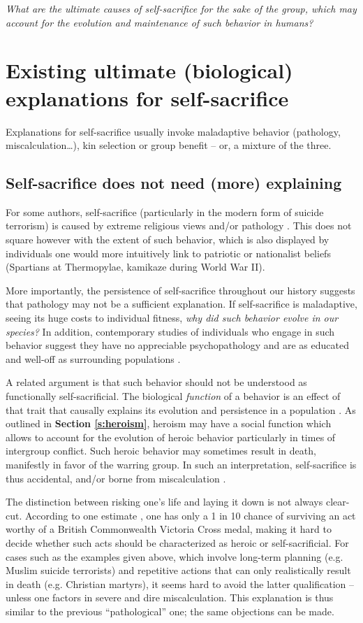 \documentclass[a4paper,12pt]{report}
\begin{document}
\emph{What are the ultimate causes of self-sacrifice for the sake of the group, 
which may account for the evolution and maintenance of such behavior in humans?}

\section{Existing ultimate (biological) explanations for self-sacrifice}
\label{s:xpla}
Explanations for self-sacrifice usually invoke maladaptive behavior
(pathology, miscalculation…), kin selection or group benefit – or, a mixture of the three.

\subsection{Self-sacrifice does not need (more) explaining}
\label{ss:error}
For some authors, self-sacrifice (particularly in the modern form of suicide terrorism)
is caused by extreme religious views and/or pathology \cite[p. 16]{pape_dying_2006}.
This does not square however with the extent of such behavior, which is also displayed
by individuals one would more intuitively link to patriotic or nationalist beliefs
(Spartians at Thermopylae, kamikaze during World War II).

More importantly, the persistence of self-sacrifice throughout our history suggests
that pathology may not be a sufficient explanation. If self-sacrifice is maladaptive,
seeing its huge costs to individual fitness, \emph{why did such behavior evolve in our species?}
In addition, contemporary studies of individuals who engage in such behavior suggest
they have no appreciable psychopathology and are as educated and well-off as 
surrounding populations \cite{atran_genesis_2003}.

A related argument is that such behavior should not be understood as
functionally self-sacrificial. The biological \emph{function} of a behavior is an effect
of that trait that causally explains its evolution and persistence in a population
\cite{nettle_evolution_2009}.
As outlined in \textbf{Section \ref{s:heroism}}, heroism may have a social function which
allows to account for the evolution of heroic behavior particularly in times of intergroup
conflict. Such heroic behavior may sometimes result in death, manifestly in favor of
the warring group. In such an interpretation, self-sacrifice is thus accidental, and/or
borne from miscalculation \cite{marie_self-sacrifice_2018}.

The distinction between risking one’s life and laying it down is not always clear-cut.
According to one estimate \cite[p. 272]{gambetta_making_2006}, one has only a 1 in 10 chance 
of surviving an act worthy of a British Commonwealth Victoria Cross medal, 
making it hard to decide whether such acts should be characterized as heroic
or self-sacrificial. For cases such as the examples given above,
which involve long-term planning (e.g. Muslim suicide terrorists)
and repetitive actions that can only realistically result in death (e.g. Christian martyrs),
it seems hard to avoid the latter qualification – unless one factors in severe and
dire miscalculation. This explanation is thus similar to the previous “pathological” one;
the same objections can be made.
\end{document}

